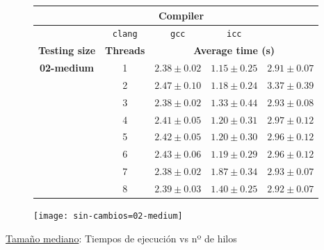 \begin{figure}[H]
    \centering
    \begin{subfigure}{0.4\textwidth}
        \begin{adjustbox}{width=\textwidth} 
        \begin{tabular}{|c|c|c|c|c|}
            \hline
            \rowcolor{azul} \multicolumn{2}{|c|}{}&\multicolumn{3}{c|}{\textbf{Compiler}} \\ \hline
            \rowcolor{azul} \multicolumn{2}{|c|}{}&\texttt{clang}&\texttt{gcc}&\texttt{icc}\\ \hline
            \rowcolor{azul} \textbf{Testing size} & \textbf{Threads}&\multicolumn{3}{c|}{\textbf{Average time (s)}} \\ \hline
            \multirow{8}{2.5cm}{\textbf{02-medium}} & 1 & \(2.38\pm{0.02}\) & \(1.15\pm{0.25}\) & \(2.91\pm{0.07}\) \\ \cline{2-5}
            & 2 & \(2.47\pm{0.10}\) & \(1.18\pm{0.24}\) & \(3.37\pm{0.39}\) \\ \cline{2-5}
            & 3 & \(2.38\pm{0.02}\) & \(1.33\pm{0.44}\) & \(2.93\pm{0.08}\) \\ \cline{2-5}
            & 4 & \(2.41\pm{0.05}\) & \(1.20\pm{0.31}\) & \(2.97\pm{0.12}\) \\ \cline{2-5}
            & 5 & \(2.42\pm{0.05}\) & \(1.20\pm{0.30}\) & \(2.96\pm{0.12}\) \\ \cline{2-5}
            & 6 & \(2.43\pm{0.06}\) & \(1.19\pm{0.29}\) & \(2.96\pm{0.12}\) \\ \cline{2-5}
            & 7 & \(2.38\pm{0.02}\) & \(1.87\pm{0.34}\) & \(2.93\pm{0.07}\) \\ \cline{2-5}
            & 8 & \(2.39\pm{0.03}\) & \(1.40\pm{0.25}\) & \(2.92\pm{0.07}\) \\ \hline
        \end{tabular}
        \end{adjustbox}
    \end{subfigure}
    \hfill
    \begin{subfigure}{0.5\textwidth}
        \texttt{[image: sin-cambios=02-medium]}
    \end{subfigure}
    \caption{\underline{Tamaño mediano}: Tiempos de ejecución vs nº de hilos}
    \label{sin-cambios=02-medium}
\end{figure}

